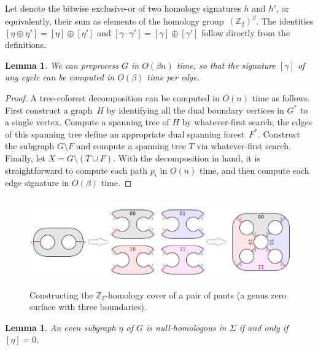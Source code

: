 \documentclass[twoside,leqno,twocolumn]{article}
\def\Z{\mathbb{Z}}
\let\cycle\gamma
\def\dualarc{p}
\newtheorem{lemma}[theorem]{Lemma}
\begin{document}
Let  denote the bitwise exclusive-or of two homology signatures $h$ and $h'$, or equivalently, their sum as elements of the homology group~$(\Z_2)^\beta$.  The identities $[\eta \oplus \eta'] = [\eta] \oplus [\eta']$ and $[\cycle\cdot\cycle'] = [\cycle] \oplus [\cycle']$ follow directly from the definitions.


\begin{lemma}
\label{L:sign}
We can preprocess $G$ in $O(\beta n)$ time, so that the signature $[\cycle]$ of any cycle can be computed in $O(\beta)$ time per edge.
\end{lemma}

\begin{proof}
A tree-coforest decomposition can be computed in $O(n)$ time as follows.  First construct a graph~$H$ by identifying all the dual boundary vertices in $G^*$ to a single vertex.  Compute a spanning tree of $H$ by whatever-first search; the edges of this spanning tree define an appropriate dual spanning forest~$F^*$.  Construct the subgraph $G\setminus F$ and compute a spanning tree $T$ via whatever-first search.  Finally, let $X = G\setminus (T\cup F)$.  With the decomposition in hand, it is straightforward to compute each path $\dualarc_i$ in $O(n)$ time, and then compute each edge signature in $O(\beta)$ time.
\end{proof}


\begin{figure}
\centering
\includegraphics[height=1.5in]{Fig/hom-cover-example}
\caption{Constructing the $\Z_2$-homology cover of a pair of pants (a genus zero surface with three boundaries).}
\label{F:cover-ex}
\end{figure}



\begin{lemma}
An even subgraph $\eta$ of $G$ is null-homologous in $\Sigma$ if and only if $[\eta] = 0$.
\end{lemma}
\end{document}
